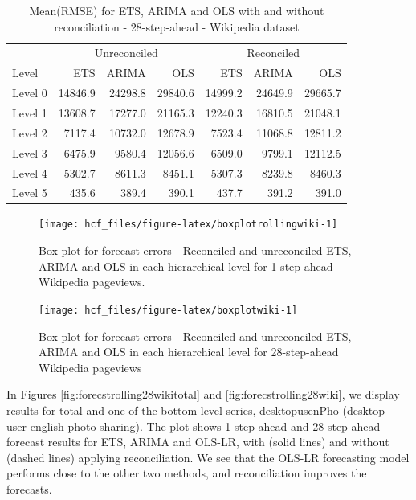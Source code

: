 \documentclass[11pt,a4paper,]{article}
\begin{document}
\begin{table}[t]

\caption{\label{tab:wikipediadataresultRMSE}Mean(RMSE) for ETS, ARIMA and OLS with and without reconciliation - 28-step-ahead - Wikipedia dataset}
\centering
\begin{tabular}{lrrrrrr}
\toprule
\multicolumn{1}{c}{} & \multicolumn{3}{c}{Unreconciled} & \multicolumn{3}{c}{Reconciled} \\
\cmidrule(l{2pt}r{2pt}){2-4} \cmidrule(l{2pt}r{2pt}){5-7}
Level & ETS & ARIMA & OLS & ETS & ARIMA & OLS\\
\midrule
Level 0 & 14846.9 & 24298.8 & 29840.6 & 14999.2 & 24649.9 & 29665.7\\
Level 1 & 13608.7 & 17277.0 & 21165.3 & 12240.3 & 16810.5 & 21048.1\\
Level 2 & 7117.4 & 10732.0 & 12678.9 & 7523.4 & 11068.8 & 12811.2\\
Level 3 & 6475.9 & 9580.4 & 12056.6 & 6509.0 & 9799.1 & 12112.5\\
Level 4 & 5302.7 & 8611.3 & 8451.1 & 5307.3 & 8239.8 & 8460.3\\
Level 5 & 435.6 & 389.4 & 390.1 & 437.7 & 391.2 & 391.0\\
\bottomrule
\end{tabular}
\end{table}

\begin{figure}

{\centering \texttt{[image: hcf\_files/figure-latex/boxplotrollingwiki-1]} 

}

\caption{Box plot for forecast errors - Reconciled and unreconciled ETS, ARIMA and OLS in each hierarchical level for 1-step-ahead Wikipedia pageviews.}\label{fig:boxplotrollingwiki}
\end{figure}

\begin{figure}

{\centering \texttt{[image: hcf\_files/figure-latex/boxplotwiki-1]} 

}

\caption{Box plot for forecast errors - Reconciled and unreconciled ETS, ARIMA and OLS in each hierarchical level for 28-step-ahead Wikipedia pageviews}\label{fig:boxplotwiki}
\end{figure}

In Figures \ref{fig:forecstrolling28wikitotal} and
\ref{fig:forecstrolling28wiki}, we display results for total and one of
the bottom level series, desktopusenPho (desktop-user-english-photo
sharing). The plot shows 1-step-ahead and 28-step-ahead forecast results
for ETS, ARIMA and OLS-LR, with (solid lines) and without (dashed lines)
applying reconciliation. We see that the OLS-LR forecasting model
performs close to the other two methods, and reconciliation improves the
forecasts.
\end{document}
